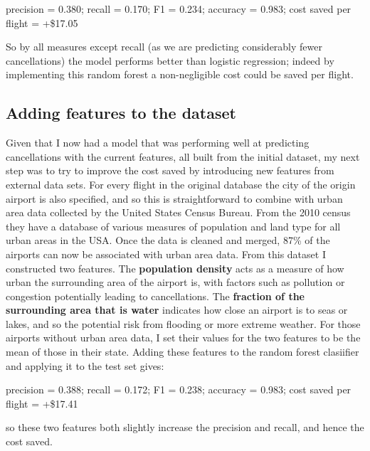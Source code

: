 \documentclass[a4paper]{article}
\begin{document}
\noindent precision = 0.380; recall = 0.170; F1 = 0.234; accuracy = 0.983; cost saved per flight = +\$17.05

\noindent So by all measures except recall (as we are predicting considerably fewer cancellations) the model performs better than logistic regression; indeed by implementing this random forest a non-negligible cost could be saved per flight.

\subsection*{Adding features to the dataset}

Given that I now had a model that was performing well at predicting cancellations with the current features, all built from the initial dataset, my next step was to try to improve the cost saved by introducing new features from external data sets. For every flight in the original database the city of the origin airport is also specified, and so this is straightforward to combine with urban area data collected by the United States Census Bureau. From the 2010 census they have a database\footnotemark[16] of various measures of population and land type for all urban areas in the USA. Once the data is cleaned and merged, 87\% of the airports can now be associated with urban area data. From this dataset I constructed two features. The {\bf population density} acts as a measure of how urban the surrounding area of the airport is, with factors such as pollution or congestion potentially leading to cancellations. The {\bf fraction of the surrounding area that is water} indicates how close an airport is to seas or lakes, and so the potential risk from flooding or more extreme weather. For those airports without urban area data, I set their values for the two features to be the mean of those in their state. Adding these features to the random forest clasiifier and applying it to the test set gives:

\noindent precision = 0.388; recall = 0.172; F1 = 0.238; accuracy = 0.983; cost saved per flight = +\$17.41

\noindent so these two features both slightly increase the precision and recall, and hence the cost saved.
\end{document}
